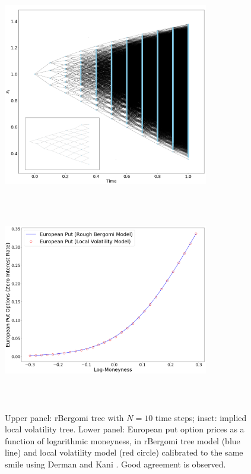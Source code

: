 \documentclass[12pt]{article}
\numberwithin{equation}{section}
\begin{document}
\begin{figure}
\begin{center}
  \includegraphics[width=0.8\textwidth, height=9cm]{big_price_tree}
  \vadjust{\vskip 10mm \vskip 0pt}
  \includegraphics[width=0.8\textwidth, height=9cm]{euput}
\caption{Upper panel: rBergomi tree with $N=10$ time steps; inset: implied local volatility tree. Lower panel: European put option prices as a function of logarithmic moneyness, in rBergomi tree model (blue line) and local volatility model (red circle) calibrated to the same smile using Derman and Kani \cite{derman}. Good agreement is observed.}
\label{fig:euput}
\end{center}
\end{figure}

\newpage
\end{document}
